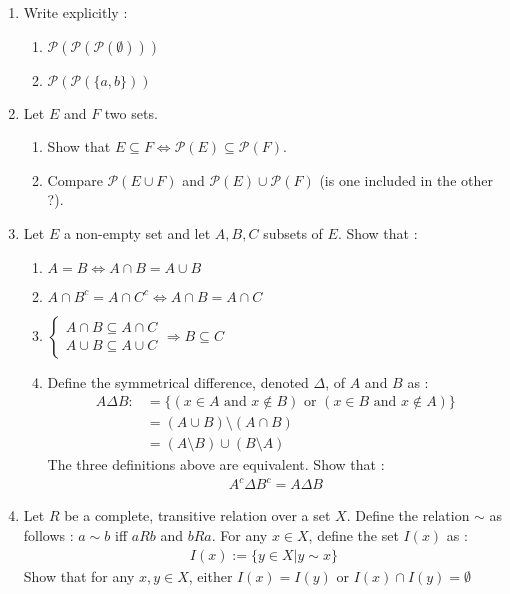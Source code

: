 \documentclass[11pt,letterpaper]{scrartcl}
\newcommand{\Pcal}{\mathcal{P}}
\begin{document}
\begin{enumerate}
	\item Write explicitly :
	\begin{enumerate}[label=\alph*.]
		\item $\Pcal(\Pcal(\Pcal(\emptyset)))$
		\item $\Pcal(\Pcal(\{a,b\}))$
	\end{enumerate}

	\item Let $E$ and $F$ two sets. 
	\begin{enumerate}[label=\alph*.]
		\item Show that $E \subseteq F \Leftrightarrow \Pcal(E) \subseteq \Pcal(F)$.
		\item Compare $\Pcal(E \cup F)$ and $\Pcal(E) \cup \Pcal(F)$ (is one included in the other ?).
	\end{enumerate}

	\item Let $E$ a non-empty set and let $A,B,C$ subsets of $E$. Show that :
		\begin{enumerate}[label=\alph*.]
			\item $A = B \Leftrightarrow A \cap B = A \cup B$
			\item $A \cap B ^c = A \cap C^c \Leftrightarrow A \cap B = A \cap C$
			\item $\begin{cases}
			A \cap B \subseteq A \cap C 
			\\
			A \cup B \subseteq A \cup C
			\end{cases} 
			\Rightarrow
			B \subseteq C$
			\item Define the symmetrical difference, denoted $\Delta$, of $A$ and $B$ as :
			\begin{align*}
			A \Delta B :&= \{ (x \in A \text{ and } x \notin B) \text{ or }  (x \in B \text{ and } x \notin A) \}
			\\ & = (A \cup B) \setminus (A \cap B)
			\\ & = (A \setminus B) \cup (B \setminus A)
			\end{align*}
			The three definitions above are equivalent. Show that :
			\begin{align*}
			A^c \Delta B^c = A \Delta B
			\end{align*}
		\end{enumerate}

	\item Let $R$ be a complete, transitive relation over a set $X$. Define the relation $\sim$ as follows : $a \sim b$ iff $aRb$ and $bRa$. For any $x \in X$, define the set $I(x)$ as :
		\begin{align*}
			I(x) := \{ y \in X | y \sim x \}
		\end{align*}
	Show that for any $x,y \in X$, either $I(x)=I(y)$ or $I(x) \cap I(y)= \emptyset$
		


\end{enumerate}
\end{document}
